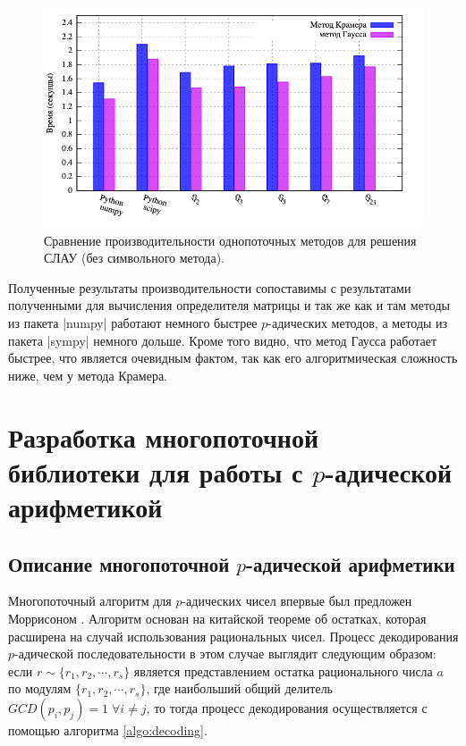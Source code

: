 \documentclass[master, och, diploma, times]{sty/SCWorks}
\theoremstyle{plain}
\theoremstyle{definition}
\numberwithin{equation}{section}
\begin{document}
\begin{figure}[H]
\centerline{\includegraphics[width=0.85\linewidth]{../gnuplot/single/system/wosymb.png}}
\caption{Сравнение производительности однопоточных методов для решения СЛАУ (без символьного метода).}
\label{img:single:system:2}
\end{figure}
 
 
Полученные результаты производительности сопоставимы с результатами полученными для вычисления определителя матрицы и так же как и там методы из пакета |numpy| работают немного быстрее $p$-адических методов, а методы из пакета |sympy| немного дольше. Кроме того видно, что метод Гаусса работает быстрее, что является очевидным фактом, так как его алгоритмическая сложность ниже, чем у метода Крамера.
 
\section{Разработка многопоточной библиотеки для работы с $p$-адической арифметикой}

\subsection{Описание многопоточной $p$-адической арифметики}

Многопоточный алгоритм для $p$-адических чисел впервые был предложен Моррисоном \cite{bib:numbers:morrison}. Алгоритм основан на китайской теореме об остатках, которая расширена на случай использования рациональных чисел. Процесс декодирования $p$-адической последовательности в этом случае выглядит следующим образом: если $r \sim \{r_1,r_2,\cdots, r_s\}$ является представлением остатка рационального числа $a$ по модулям $\{r_1,r_2,\cdots, r_s\}$, где наибольший общий делитель $GCD(p_i, p_j) =1 \; \forall i \neq j$, то тогда процесс декодирования осуществляется с помощью алгоритма \ref{algo:decoding}\cite{bib:numbers:newman}\cite{bib:numbers:dixon}.
\end{document}
